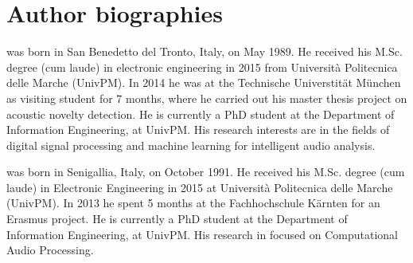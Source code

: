 \documentclass[review]{elsarticle}
\begin{document}


\newpage
\section*{Author biographies}


 was born in San Benedetto del Tronto, Italy, on May 1989. He received his M.Sc. degree (cum laude) in electronic engineering in 2015 from Universit\`{a} Politecnica delle Marche (UnivPM). In 2014 he was at the Technische Universtit\"at M\"unchen as visiting student for 7 months, where he carried out his master thesis project on acoustic novelty detection. He is currently a PhD student at the Department of Information Engineering, at UnivPM. His research interests are in the fields of digital signal processing and machine learning for intelligent audio analysis.
\vspace{1cm}

 was born in Senigallia, Italy, on October 1991. He received his M.Sc. degree (cum laude) in Electronic Engineering in 2015 at Universit\`{a} Politecnica delle Marche (UnivPM). In 2013 he spent 5 months at the Fachhochschule K\"arnten for an Erasmus project. He is currently a PhD student at the Department of Information Engineering, at UnivPM. His research in focused on Computational Audio Processing.
\vspace{1cm}
\end{document}
